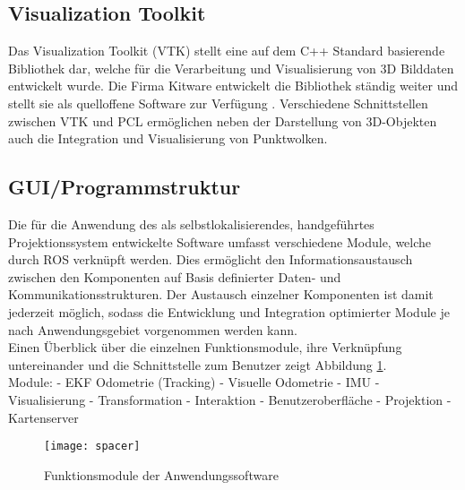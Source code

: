\subsection{Visualization Toolkit}
Das Visualization Toolkit (VTK) stellt eine auf dem C++ Standard basierende Bibliothek dar, welche für die Verarbeitung und Visualisierung von 3D Bilddaten entwickelt wurde. Die Firma Kitware entwickelt die Bibliothek ständig weiter und stellt sie als quelloffene Software zur Verfügung \cite{VTK}. Verschiedene Schnittstellen zwischen VTK und PCL ermöglichen neben der Darstellung von 3D-Objekten auch die Integration und Visualisierung von Punktwolken. \red[Ausführlicher?\\]
\red[Versionen!\\]

\subsection{GUI/Programmstruktur}
%
Die für die Anwendung des  als selbstlokalisierendes, handgeführtes Projektionssystem entwickelte Software umfasst verschiedene Module, welche durch ROS verknüpft werden. Dies ermöglicht den Informationsaustausch zwischen den Komponenten auf Basis definierter Daten- und Kommunikationsstrukturen. Der Austausch einzelner Komponenten ist damit jederzeit möglich, sodass die Entwicklung und Integration optimierter Module je nach Anwendungsgebiet vorgenommen werden kann.\\
Einen Überblick über die einzelnen Funktionsmodule, ihre Verknüpfung untereinander und die Schnittstelle zum Benutzer zeigt Abbildung \ref{fig.modules}.\\

Module: \mLocalization - EKF Odometrie (Tracking) - Visuelle Odometrie - IMU - Visualisierung - Transformation - Interaktion - Benutzeroberfläche - Projektion - Kartenserver\\

\begin{figure}[ht]
	\begin{center}
		\texttt{[image: spacer]}
		\caption{Funktionsmodule der Anwendungssoftware}
		\label{fig.modules}
	\end{center}
\end{figure}


